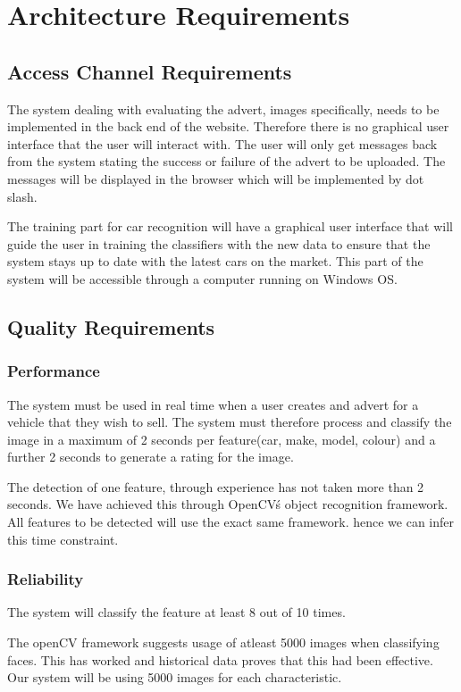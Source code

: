 \section{Architecture Requirements}
\subsection{Access Channel Requirements}
The system dealing with evaluating the advert, images specifically, needs to be implemented in the back end of the website. Therefore there is no graphical user interface that the user will interact with. The user will only get messages back from the system stating the success or failure of the advert to be uploaded. The messages will be displayed in the browser which will be implemented by dot slash. 

The training part for car recognition will have a graphical user interface that will guide the user in training the classifiers with the new data to ensure that the system stays up to date with the latest cars on the market. This part of the system will be accessible through a computer running on Windows OS.

\subsection{Quality Requirements}

\subsubsection{Performance}
The system must be used in real time when a user creates and advert for a vehicle that they wish to sell. The system must therefore process and classify the image in a maximum of 2 seconds per feature(car, make, model, colour) and a further 2 seconds to generate a rating for the image.

The detection of one feature, through experience has not taken more than 2 seconds. We have achieved this through OpenCV\'s object recognition framework. All features to be detected will use the exact same framework. hence we can infer this time constraint. 
\subsubsection{Reliability}
The system will classify the feature at least 8 out of 10 times.

The openCV framework suggests usage of atleast 5000 images when classifying faces. This has worked and historical data proves that this had been effective. Our system will be using 5000 images for each characteristic.
